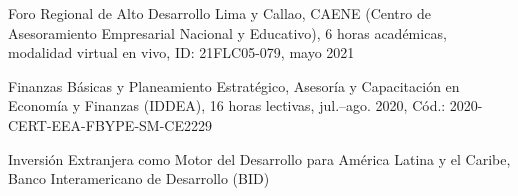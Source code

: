 \begin{scholarship}










  {Foro Regional de Alto Desarrollo Lima y Callao,
   CAENE (Centro de Asesoramiento Empresarial Nacional y Educativo),
   6 horas académicas, modalidad virtual en vivo, ID: 21FLC05-079, mayo 2021}


  {Finanzas Básicas y Planeamiento Estratégico,
   Asesoría y Capacitación en Economía y Finanzas (IDDEA),
   16 horas lectivas, jul.--ago. 2020, Cód.: 2020-CERT-EEA-FBYPE-SM-CE2229}

  {Inversión Extranjera como Motor del Desarrollo para América Latina y el Caribe,
   Banco Interamericano de Desarrollo (BID)}


\end{scholarship}
